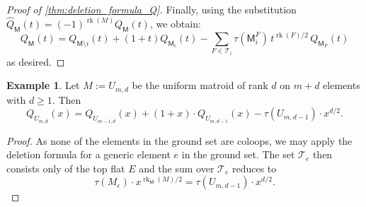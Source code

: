 \documentclass[11pt, a4paper, english]{amsart}
\theoremstyle{teoremas}
\theoremstyle{definition}
\newtheorem{example}[theorem]{Example}
\DeclareMathOperator{\rk}{rk}
\newcommand{\M}{\mathsf{M}}
\begin{document}
\begin{proof}[Proof of \ref{thm:deletion_formula_Q}]
    Finally, using the substitution $\hat{Q}_{\M}(t) = (-1)^{\rk(M)} Q_{\M}(t)$, we obtain:
    \[ Q_{\M}(t) = Q_{\M\setminus i}(t) + (1+t) Q_{\M_i}(t) - \sum_{F\in \mathscr{T}_i} \tau(\M^F_i)\, t^{\rk(F)/2}\, Q_{\M_F}(t)\]
    as desired.
\end{proof}

\begin{example}\label{ex:deletion_formula_Q_uniform}
    Let $M:=U_{m,d}$ be the uniform matroid of rank $d$ on $m+d$ elements with $d\geq 1$. Then
    \[
        Q_{U_{m,d}}(x) = Q_{U_{m-1,d}}(x) + (1 + x)\cdot Q_{U_{m,d-1}}(x) -
        \tau(U_{m,d-1})\cdot x^{d/2}.
    \]
\end{example}
\begin{proof}
    As none of the elements in the ground set are coloops, we may apply the deletion formula for a generic element $e$ in the ground set. The set $\mathscr{T}_e$ then consists only of the top flat $E$ and the sum over $\mathscr{T}_e$ reduces to \[\tau(M_e)\cdot x^{\rk_{\M}(M)/2}
        = \tau(U_{m,d-1})\cdot x^{d/2}.\]
\end{proof}
\end{document}
